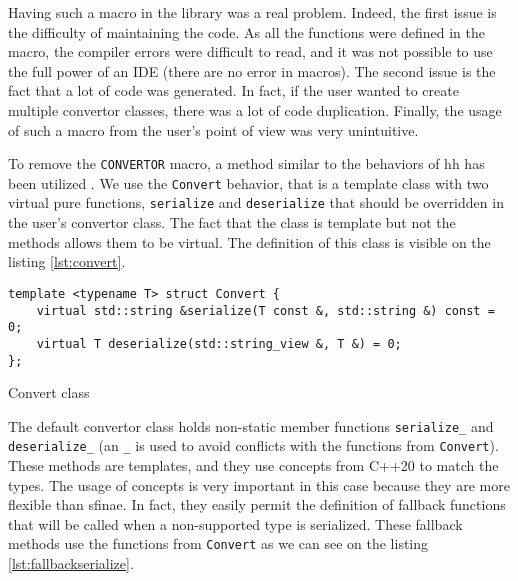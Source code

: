 Having such a macro in the library was a real problem. Indeed, the first issue
is the difficulty of maintaining the code. As all the functions were defined in
the macro, the compiler errors were difficult to read, and it was not possible
to use the full power of an IDE (there are no error in macros). The second issue
is the fact that a lot of code was generated. In fact, if the user wanted to
create multiple convertor classes, there was a lot of code duplication. Finally,
the usage of such a macro from the user's point of view was very unintuitive.

To remove the \texttt{CONVERTOR} macro, a method similar to the behaviors of
\gls{hh} has been utilized \cite{bardakoff2021analysis}. We use the
\texttt{Convert} behavior, that is a template class with two virtual pure
functions, \texttt{serialize} and \texttt{deserialize} that should be overridden
in the user's convertor class. The fact that the class is template but not the
methods allows them to be virtual. The definition of this class is visible on
the listing \ref{lst:convert}.

\begin{listing}[ht!]
\begin{verbatim}
template <typename T> struct Convert {
    virtual std::string &serialize(T const &, std::string &) const = 0;
    virtual T deserialize(std::string_view &, T &) = 0;
};
\end{verbatim}
\caption{Convert class}
\label{lst:Convert}
\end{listing}

The default convertor class holds non-static member functions
\texttt{serialize\_} and \texttt{deserialize\_} (an \texttt{\_} is used to avoid
conflicts with the functions from \texttt{Convert}). These methods are
templates, and they use concepts from C++20 to match the types. The usage of
concepts is very important in this case because they are more flexible than
\gls{sfinae}. In fact, they easily permit the definition of fallback functions
that will be called when a non-supported type is serialized. These fallback
methods use the functions from \texttt{Convert} as we can see on the listing
\ref{lst:fallbackserialize}.

